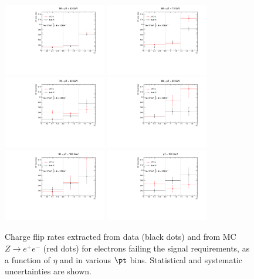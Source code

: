 \begin{figure}[h!]
\includegraphics[width=0.4\textwidth]{FIGURES/BKG/chargeFlip/CFratesLOOSE___dataVSmc___PTbin4.pdf}
\includegraphics[width=0.4\textwidth]{FIGURES/BKG/chargeFlip/CFratesLOOSE___dataVSmc___PTbin5.pdf}
\vfill
\includegraphics[width=0.4\textwidth]{FIGURES/BKG/chargeFlip/CFratesLOOSE___dataVSmc___PTbin6.pdf}
\includegraphics[width=0.4\textwidth]{FIGURES/BKG/chargeFlip/CFratesLOOSE___dataVSmc___PTbin7.pdf}
\vfill
\includegraphics[width=0.4\textwidth]{FIGURES/BKG/chargeFlip/CFratesLOOSE___dataVSmc___PTbin8.pdf}
\includegraphics[width=0.4\textwidth]{FIGURES/BKG/chargeFlip/CFratesLOOSE___dataVSmc___PTbin9.pdf}
\caption{\label{fig:CFratesLoose_2} Charge flip rates extracted from data (black dots) and from MC $Z\to e^+e^-$ (red dots) for electrons failing the signal requirements, as a function of $\eta$ and in various $\pt$ bins. Statistical and systematic uncertainties are shown.}
\end{figure}
